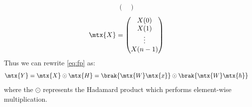 \documentclass[journal,12pt,twocolumn]{IEEEtran}
\theoremstyle{remark}
\begin{document}
\begin{enumerate}[label=\thesection.\arabic*]
\begin{align}
\begin{pmatrix}
																																																																											\end{pmatrix}
																																																																											\end{align}
																																																																											\begin{align}
																																																																												\mtx{X} = 
																																																																													\begin{pmatrix}
																																																																															X(0) \\ X(1) \\ \vdots \\ X(n - 1)
																																																																																\end{pmatrix}
																																																																																\end{align}
																																																																																Thus we can rewrite  \eqref{eq:fp} as:
																																																																																\begin{align}
																																																																																	\mtx{Y} = \mtx{X}\odot\mtx{H} = \brak{\mtx{W}\mtx{x}}\odot\brak{\mtx{W}\mtx{h}}
																																																																																	\end{align}
																																																																																	where the $\odot$ represents the Hadamard product which performs element-wise multiplication.
																																																																																	\end{enumerate}
\end{document}
